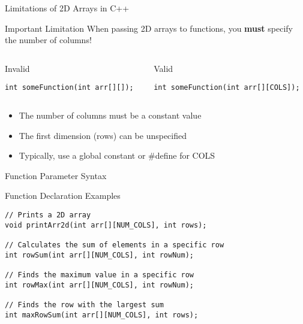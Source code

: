 \documentclass{beamer}
\begin{document}
\begin{frame}{Limitations of 2D Arrays in C++}
    \begin{alertblock}{Important Limitation}
        When passing 2D arrays to functions, you \textbf{must} specify the number of columns!
    \end{alertblock}
    
    \begin{columns}
        \begin{column}{0.45\textwidth}
            \begin{block}{\textcolor{ds9red}{Invalid}}
                \begin{lstlisting}
int someFunction(int arr[][]);
                \end{lstlisting}
            \end{block}
        \end{column}
        \begin{column}{0.45\textwidth}
            \begin{block}{\textcolor{ds9blue}{Valid}}
                \begin{lstlisting}
int someFunction(int arr[][COLS]);
                \end{lstlisting}
            \end{block}
        \end{column}
    \end{columns}
    
    \begin{itemize}
        \item The number of columns must be a constant value
        \item The first dimension (rows) can be unspecified
        \item Typically, use a global constant or \#define for COLS
    \end{itemize}
\end{frame}

\begin{frame}{Function Parameter Syntax}
    \begin{exampleblock}{Function Declaration Examples}
        \begin{lstlisting}
// Prints a 2D array
void printArr2d(int arr[][NUM_COLS], int rows);

// Calculates the sum of elements in a specific row
int rowSum(int arr[][NUM_COLS], int rowNum);

// Finds the maximum value in a specific row
int rowMax(int arr[][NUM_COLS], int rowNum);

// Finds the row with the largest sum
int maxRowSum(int arr[][NUM_COLS], int rows);
        \end{lstlisting}
    \end{exampleblock}
\end{frame}
\end{document}
